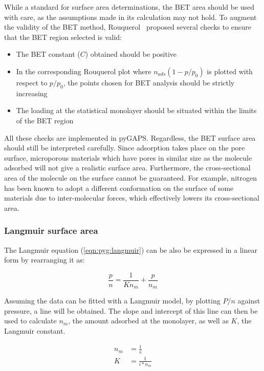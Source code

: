 While a standard for surface area determinations, the BET area
should be used with care, as the assumptions made in
its calculation may not hold. To augment the validity of the BET
method, Rouquerol~\cite{rouquerolAdsorptionPowdersPorous2013} proposed
several checks to ensure that the BET region selected is valid:

\begin{itemize}

	\item The BET constant (\(C\)) obtained should be positive
    \item In the corresponding Rouquerol plot where \(n_{ads}(1-p/p_0)\)
    is plotted with respect to \(p/p_0\), the points chosen for BET
	analysis should be strictly increasing
	\item The loading at the statistical monolayer should be
	situated within the limits of the BET region

\end{itemize}

All these checks are implemented in pyGAPS.
Regardless, the BET surface area should still be interpreted carefully.
Since adsorption takes place on the pore surface, microporous materials
which have pores in similar size as the molecule adsorbed will not
give a realistic surface area. Furthermore, the cross-sectional area
of the molecule on the surface cannot be guaranteed. For example, 
nitrogen has been known to adopt a different conformation on the surface
of some materials due to inter-molecular forces, which effectively
lowers its cross-sectional area.

\subsubsection{Langmuir surface area}

The Langmuir equation (\ref{eqn:pyg:langmuir}) can be also 
be expressed in a linear form by rearranging it as:

\begin{equation}
	\frac{p}{n} = \frac{1}{K n_m} + \frac{p}{n_m}
\end{equation}

Assuming the data can be fitted with a Langmuir model, by plotting
\({P}/{n}\) against pressure, a line will be obtained. The slope and
intercept of this line can then be used to calculate \(n_{m}\),
the amount adsorbed at the monolayer, as well as \(K\), the Langmuir constant.

\begin{align}
	n_m &= \frac{1}{s} \\
	K &= \frac{1}{i * n_m}
\end{align}

